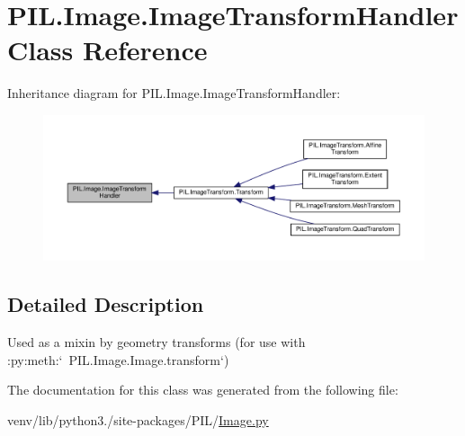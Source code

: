 \hypertarget{classPIL_1_1Image_1_1ImageTransformHandler}{}\section{P\+I\+L.\+Image.\+Image\+Transform\+Handler Class Reference}
\label{classPIL_1_1Image_1_1ImageTransformHandler}


Inheritance diagram for P\+I\+L.\+Image.\+Image\+Transform\+Handler\+:
\nopagebreak
\begin{figure}[H]
\begin{center}
\leavevmode
\includegraphics[width=350pt]{classPIL_1_1Image_1_1ImageTransformHandler__inherit__graph}
\end{center}
\end{figure}


\subsection{Detailed Description}
\begin{DoxyVerb}Used as a mixin by geometry transforms
(for use with :py:meth:`~PIL.Image.Image.transform`)
\end{DoxyVerb}
 

The documentation for this class was generated from the following file\+:\begin{DoxyCompactItemize}
\item 
venv/lib/python3./site-\/packages/\+P\+I\+L/\hyperlink{Image_8py}{Image.\+py}\end{DoxyCompactItemize}

